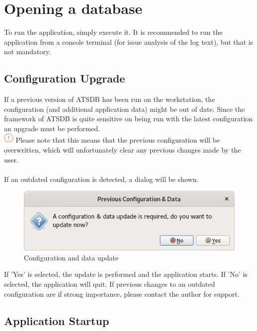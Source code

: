 \section{Opening a database}

To run the application, simply execute it. It is recommended to run the application from a console terminal (for issue analysis of the log text), but that is not mandatory.

\subsection{Configuration Upgrade}

If a previous version of ATSDB has been run on the workstation, the configuration (and additional application data) might be out of date. Since the framework of ATSDB is quite sensitive on being run with the latest configuration an upgrade must be performed. \\

\includegraphics[width=0.5cm]{../../data/icons/hint.png} Please note that this means that the previous configuration will be overwritten, which will unfortunately clear any previous changes made by the user. \\\\

If an outdated configuration is detected, a dialog will be shown.

\begin{figure}[H]
    \includegraphics[width=12cm,frame]{../screenshots/config_data_update.png}
  \caption{Configuration and data update}
  \label{fig:db_connect}
\end{figure}

If 'Yes' is selected, the update is performed and the application starts. If 'No' is selected, the application will quit. If previous changes to an outdated configuration are if strong importance, please contact the author for support.

\subsection{Application Startup}
\label{sec:startup}

